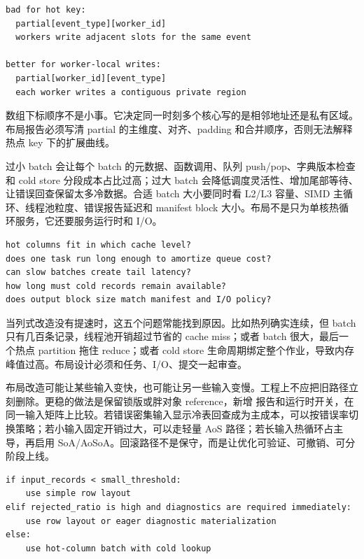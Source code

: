 \begin{lstlisting}[numbers=none,caption={partial 布局的两种地址形状}]
bad for hot key:
  partial[event_type][worker_id]
  workers write adjacent slots for the same event

better for worker-local writes:
  partial[worker_id][event_type]
  each worker writes a contiguous private region
\end{lstlisting}

数组下标顺序不是小事。它决定同一时刻多个核心写的是相邻地址还是私有区域。布局报告必须写清 partial 的主维度、对齐、padding 和合并顺序，否则无法解释热点 key 下的扩展曲线。

过小 batch 会让每个 batch 的元数据、函数调用、队列 push/pop、字典版本检查和 cold store 分段成本占比过高；过大 batch 会降低调度灵活性、增加尾部等待、让错误回查保留太多冷数据。合适 batch 大小要同时看 L2/L3 容量、SIMD 主循环、线程池粒度、错误报告延迟和 manifest block 大小。布局不是只为单核热循环服务，它还要服务运行时和 I/O。

\begin{lstlisting}[numbers=none,caption={batch 大小选择要同时回答的问题}]
hot columns fit in which cache level?
does one task run long enough to amortize queue cost?
can slow batches create tail latency?
how long must cold records remain available?
does output block size match manifest and I/O policy?
\end{lstlisting}

当列式改造没有提速时，这五个问题常能找到原因。比如热列确实连续，但 batch 只有几百条记录，线程池开销超过节省的 cache miss；或者 batch 很大，最后一个热点 partition 拖住 reduce；或者 cold store 生命周期绑定整个作业，导致内存峰值过高。布局设计必须和任务、I/O、提交一起审查。

布局改造可能让某些输入变快，也可能让另一些输入变慢。工程上不应把旧路径立刻删除。更稳的做法是保留锁版或胖对象 reference，新增  报告和运行时开关，在同一输入矩阵上比较。若错误密集输入显示冷表回查成为主成本，可以按错误率切换策略；若小输入固定开销过大，可以走轻量 AoS 路径；若长输入热循环占主导，再启用 SoA/AoSoA。回滚路径不是保守，而是让优化可验证、可撤销、可分阶段上线。

\begin{lstlisting}[numbers=none,caption={布局策略选择的运行时依据}]
if input_records < small_threshold:
    use simple row layout
elif rejected_ratio is high and diagnostics are required immediately:
    use row layout or eager diagnostic materialization
else:
    use hot-column batch with cold lookup
\end{lstlisting}


